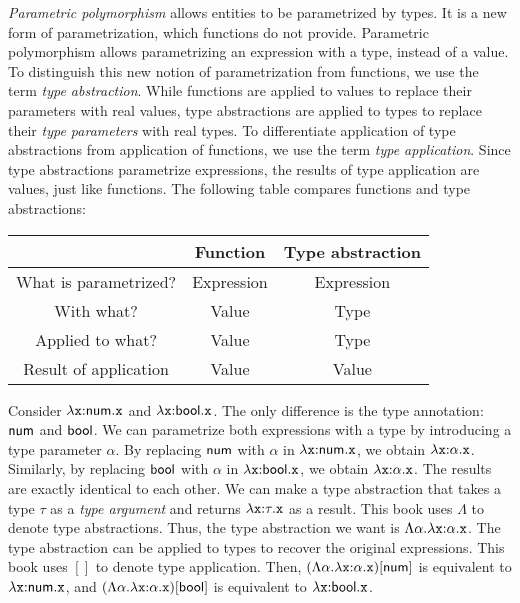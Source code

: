 \textit{Parametric polymorphism}
allows entities to be parametrized by types. It is a new form of
parametrization, which functions do not provide. Parametric polymorphism allows
parametrizing an expression with a type, instead of a value. To distinguish this
new notion of parametrization from functions, we use the term \textit{type
abstraction}. While functions are applied to values to
replace their parameters with real values, type abstractions are applied to
types to replace their \textit{type parameters} with real
types. To differentiate application of type abstractions from application of
functions, we use the term \textit{type application}.
Since type abstractions parametrize expressions, the results of type application
are values, just like functions.
The following table compares functions and type abstractions:
\begin{center}
\begin{tabular}{c|c|c}
  & Function & Type abstraction \\\hline
  What is parametrized? & Expression & Expression \\
  With what? & Value & Type \\
  Applied to what? & Value & Type \\
  Result of application & Value & Value \\
\end{tabular}
\end{center}

Consider $\lambda\texttt{x}{:}\textsf{num}.\texttt{x}$ and $\lambda\texttt{x}{:}\textsf{bool}.\texttt{x}$.
The only difference is the type annotation: $\textsf{num}$ and $\textsf{bool}$.
We can parametrize both expressions with a type by introducing a type parameter
$\alpha$. By replacing $\textsf{num}$ with $\alpha$ in $\lambda\texttt{x}{:}\textsf{num}.\texttt{x}$, we
obtain $\lambda\texttt{x}{:}\alpha.\texttt{x}$. Similarly, by replacing $\textsf{bool}$
with $\alpha$ in $\lambda\texttt{x}{:}\textsf{bool}.\texttt{x}$, we obtain
$\lambda\texttt{x}{:}\alpha.\texttt{x}$. The results are exactly identical to each other.
We can make a type abstraction that takes a type $\tau$ as a \textit{type
argument} and returns $\lambda\texttt{x}{:}\tau.\texttt{x}$ as a result.
This book uses $\Lambda$ to denote type abstractions. Thus, the type abstraction
we want is $\Lambda\alpha.\lambda\texttt{x}{:}\alpha.\texttt{x}$. The type abstraction can
be applied to types to recover the original expressions. This book uses $[]$ to
denote type application. Then,
$(\Lambda\alpha.\lambda\texttt{x}{:}\alpha.\texttt{x})[\textsf{num}]$ is equivalent to
$\lambda\texttt{x}{:}\textsf{num}.\texttt{x}$, and
$(\Lambda\alpha.\lambda\texttt{x}{:}\alpha.\texttt{x})[\textsf{bool}]$ is equivalent to
$\lambda\texttt{x}{:}\textsf{bool}.\texttt{x}$.

